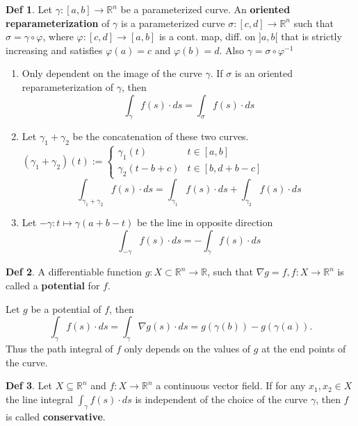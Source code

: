 \documentclass[a4paper, 10pt]{article}
\theoremstyle{definition}
\newtheorem*{definition}{Def}
\newcommand{\R}{\mathbb{R}}
\begin{document}
\begin{definition}
    Let \(\gamma: [a, b] \to \R^n\) be a parameterized curve. An \textbf{oriented reparameterization} of \(\gamma\) is a parameterized curve \(\sigma: [c, d] \to \R^n\) such that \(\sigma = \gamma \circ \varphi\), where \(\varphi: [c, d] \to [a, b]\) is a cont. map, diff. on \(]a, b[\) that is strictly increasing and satisfies \(\varphi(a) = c\) and \(\varphi(b) = d\). Also \(\gamma = \sigma \circ \varphi^{-1}\)
\end{definition}

\begin{ntheorem*}
    \begin{enumerate}[leftmargin=15pt]
        \item Only dependent on the image of the curve \(\gamma\). If \(\sigma\) is an oriented reparameterization of \(\gamma\), then
        \[\int_\gamma f(s) \cdot ds = \int_\sigma f(s) \cdot ds\]
        \item Let \(\gamma_1 + \gamma_2\) be the concatenation of these two curves. \((\gamma_1 + \gamma_2)(t) := \begin{cases}
            \gamma_1(t) & t \in [a, b] \\
            \gamma_2(t - b + c) & t \in [b, d + b - c]
        \end{cases}\)
        \[\int_{\gamma_1 + \gamma_2} f(s) \cdot ds = \int_{\gamma_1} f(s) \cdot ds + \int_{\gamma_2} f(s) \cdot ds\]
        \item Let \(-\gamma: t \mapsto \gamma(a + b - t)\) be the line in opposite direction
        \[\int_{-\gamma} f(s) \cdot ds = - \int_\gamma f(s) \cdot ds\]
    \end{enumerate}
\end{ntheorem*}

\begin{definition}
    A differentiable function \(g: X \subset \R^n \to \R\), such that \(\nabla g = f, f : X \to \R^n\) is called a \textbf{potential} for \(f\).
\end{definition}

\begin{note*}
    Let \(g\) be a potential of \(f\), then
    \[\int_\gamma f(s) \cdot ds = \int_\gamma \nabla g(s) \cdot ds = g(\gamma(b)) - g(\gamma(a)).\]
    Thus the path integral of \(f\) only depends on the values of \(g\) at the end points of the curve.
\end{note*}

\begin{definition}
    Let \(X \subseteq \R^n\) and \(f: X \to \R^n\) a continuous vector field. If for any \(x_1, x_2 \in X\) the line integral \(\int_\gamma f(s) \cdot ds\) is independent of the choice of the curve \(\gamma\), then \(f\) is called \textbf{conservative}.
\end{definition}
\end{document}
